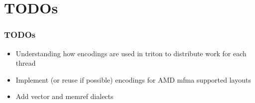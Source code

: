 \documentclass[t, pdftex, aspectratio=169]{beamer}  %
\begin{document}
\section{TODOs}

\begin{frame}
  \frametitle{TODOs}
  \begin{itemize}
  \item Understanding how encodings are used in triton to distribute work for each thread
  \item Implement (or reuse if possible) encodings for AMD mfma supported layouts
  \item Add vector and memref dialects
  \end{itemize}
\end{frame}
	
\end{document}
